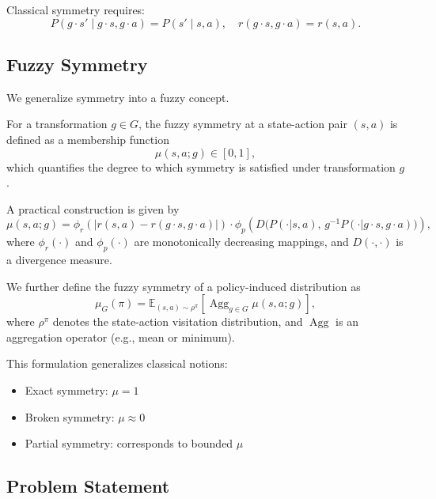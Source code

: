 Classical symmetry requires:
\begin{equation}
P(g \cdot s' \mid g \cdot s, g \cdot a) = P(s' \mid s, a), \quad
r(g \cdot s, g \cdot a) = r(s, a).
\end{equation}

\subsection{Fuzzy Symmetry}

We generalize symmetry into a fuzzy concept.

\begin{definition}
For a transformation $g \in G$, the fuzzy symmetry at a state-action pair $(s,a)$ is defined as a membership function
\begin{equation}
\mu(s,a; g) \in [0,1],
\end{equation}
which quantifies the degree to which symmetry is satisfied under transformation $g$.
\end{definition}

A practical construction is given by
\begin{equation}
\mu(s,a; g) =
\phi_r\!\left(|r(s,a) - r(g \cdot s, g \cdot a)|\right)
\cdot
\phi_p\!\left(D\big(P(\cdot|s,a),\, g^{-1}P(\cdot|g \cdot s, g \cdot a)\big)\right),
\end{equation}
where $\phi_r(\cdot)$ and $\phi_p(\cdot)$ are monotonically decreasing mappings, and $D(\cdot,\cdot)$ is a divergence measure.

We further define the fuzzy symmetry of a policy-induced distribution as
\begin{equation}
\mu_G(\pi) = \mathbb{E}_{(s,a) \sim \rho^\pi} \left[ \operatorname{Agg}_{g \in G} \mu(s,a; g) \right],
\end{equation}
where $\rho^\pi$ denotes the state-action visitation distribution, and $\operatorname{Agg}$ is an aggregation operator (e.g., mean or minimum).

This formulation generalizes classical notions:
\begin{itemize}
\item Exact symmetry: $\mu = 1$
\item Broken symmetry: $\mu \approx 0$
\item Partial symmetry: corresponds to bounded $\mu$
\end{itemize}

\subsection{Problem Statement}

